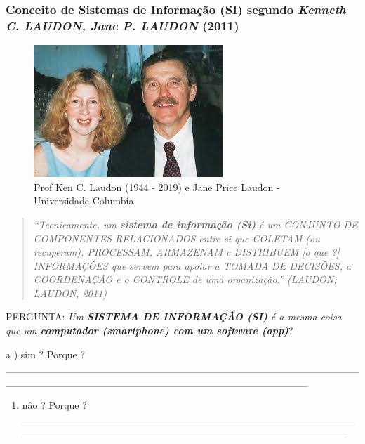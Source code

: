 \documentclass[
]{book}
\providecommand{\tightlist}{%
  \setlength{\itemsep}{0pt}\setlength{\parskip}{0pt}}
\begin{document}
\subsubsection{\texorpdfstring{Conceito de Sistemas de Informação (SI) segundo \emph{Kenneth C. LAUDON, Jane P. LAUDON} (2011)}{Conceito de Sistemas de Informação (SI) segundo Kenneth C. LAUDON, Jane P. LAUDON (2011)}}\label{conceito-de-sistemas-de-informauxe7uxe3o-si-segundo-kenneth-c.-laudon-jane-p.-laudon-2011}

\begin{figure}
\centering
\includegraphics{images/Ken_Jane.jpg}
\caption{Prof Ken C. Laudon (1944 - 2019) e Jane Price Laudon - Universidade Columbia}
\end{figure}

\begin{quote}
\emph{``Tecnicamente, um \textbf{sistema de informação (Si)} é um CONJUNTO DE COMPONENTES RELACIONADOS entre si que COLETAM (ou recuperam), PROCESSAM, ARMAZENAM c DISTRIBUEM {[}o que ?{]} INFORMAÇÕES que servem para apoiar a TOMADA DE DECISÕES, a COORDENAÇÃO e o CONTROLE de uma organização.'' (LAUDON; LAUDON, 2011)}
\end{quote}

PERGUNTA: \emph{Um \textbf{SISTEMA DE INFORMAÇÃO (SI)} é a mesma coisa que um \textbf{computador (smartphone) com um software (app)}}?

a ) sim ? Porque ?\_\_\_\_\_\_\_\_\_\_\_\_\_\_\_\_\_\_\_\_\_\_\_\_\_\_\_\_\_\_\_\_\_\_\_\_\_\_\_\_\_\_\_\_\_\_\_\_\_\_\_\_\_\_\_\_\_\_\_\_\_\_\_\_\_\_\_\_\_\_\_\_\_\_\_\_\_\_\_\_\_\_\_\_\_\_\_\_\_

\begin{enumerate}
\def\labelenumi{\alph{enumi})}
\setcounter{enumi}{1}
\tightlist
\item
  nâo ? Porque ?\_\_\_\_\_\_\_\_\_\_\_\_\_\_\_\_\_\_\_\_\_\_\_\_\_\_\_\_\_\_\_\_\_\_\_\_\_\_\_\_\_\_\_\_\_\_\_\_\_\_\_\_\_\_\_\_\_\_\_\_\_\_\_\_\_\_\_\_\_\_\_\_\_\_\_\_\_\_\_\_\_\_\_\_\_\_\_\_\_
\end{enumerate}
\end{document}
